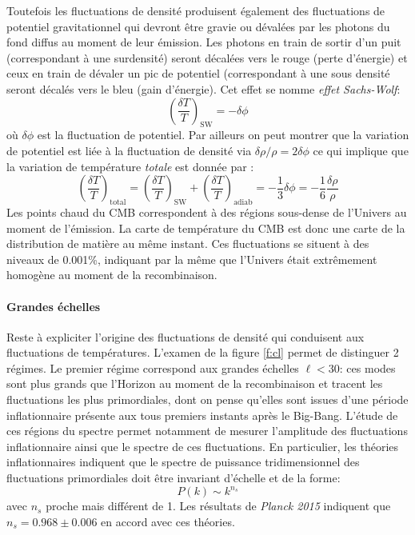 Toutefois les fluctuations de densité produisent également des fluctuations de potentiel gravitationnel qui devront être gravie ou dévalées par les photons du fond diffus au moment de leur émission. Les photons en train de sortir d'un puit (correspondant à une surdensité) seront décalées vers le rouge (perte d'énergie) et ceux en train de dévaler un pic de potentiel (correspondant à une sous densité seront décalés vers le bleu (gain d'énergie). Cet effet se nomme \textit{effet Sachs-Wolf}:
\begin{equation}
\left(\frac{\delta T}{T}\right)_\mathrm{SW}=-\delta\phi
\end{equation}
où $\delta \phi$ est la fluctuation de potentiel. Par ailleurs on peut montrer que la variation de potentiel est liée à la fluctuation de densité via $\delta \rho/\rho=2\delta \phi$ ce qui implique que la variation de température \textit{totale} est donnée par :
\begin{equation}
\left(\frac{\delta T}{T}\right)_\mathrm{total}=\left(\frac{\delta T}{T}\right)_\mathrm{SW}+\left(\frac{\delta T}{T}\right)_\mathrm{adiab}=-\frac{1}{3}\delta \phi=-\frac{1}{6}\frac{\delta \rho}{\rho}
\end{equation}
Les points chaud du CMB correspondent à des régions sous-dense de l'Univers au moment de l'émission. La carte de température du CMB est donc une carte de la distribution de matière au même instant. Ces fluctuations se situent à des niveaux de 0.001\%, indiquant par la même que l'Univers était extrêmement homogène au moment de la recombinaison.

\paragraph{Grandes échelles} Reste à expliciter l'origine des fluctuations de densité qui conduisent aux fluctuations de températures. L'examen de la figure \ref{f:cl} permet de distinguer 2 régimes. Le premier régime correspond aux grandes échelles $\ell<30$: ces modes sont plus grands que l'Horizon au moment de la recombinaison et tracent les fluctuations les plus primordiales, dont on pense qu'elles sont issues d'une période inflationnaire présente aux tous premiers instants après le Big-Bang. L'étude de ces régions du spectre permet notamment de mesurer l'amplitude des fluctuations inflationnaire ainsi que le spectre de ces fluctuations. En particulier, les théories inflationnaires indiquent que le spectre de puissance tridimensionnel des fluctuations primordiales doit être invariant d'échelle et de la forme:
\begin{equation}
P(k)\sim k^{n_s}
\end{equation}
avec $n_s$ proche mais différent de 1. Les résultats de \textit{Planck 2015} indiquent que $n_s=0.968\pm0.006$ en accord avec ces théories.

